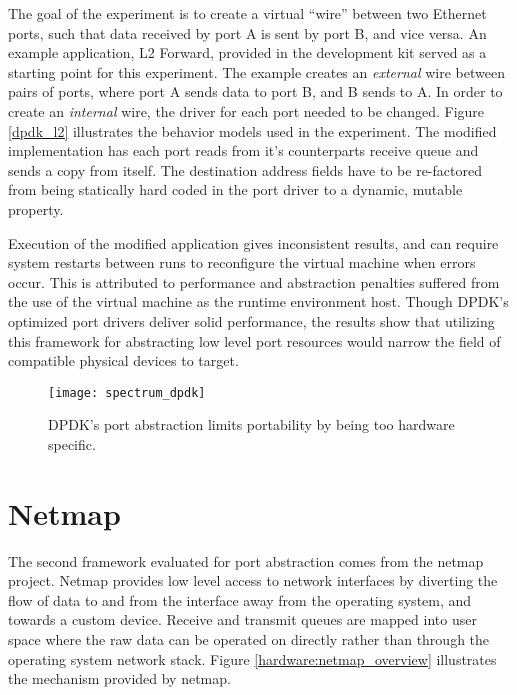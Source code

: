 The goal of the experiment is to create a virtual ``wire'' between two Ethernet
ports, such that data received by port A is sent by port B, and vice versa. An
example application, L2 Forward, provided in the development kit served as a
starting point for this experiment. The example creates an \emph{external}
wire between pairs of ports, where port A sends data to port B, and B sends to
A. In order to create an \emph{internal} wire, the driver for each port needed
to be changed. Figure \ref{dpdk_l2} illustrates the behavior models used in the
experiment. The modified implementation has each port reads from it's
counterparts receive queue and sends a copy from itself.  The destination
address fields have to be re-factored from being statically hard coded in the
port driver to a dynamic, mutable property.

Execution of the modified application gives inconsistent results, and can
require system restarts between runs to reconfigure the virtual machine when
errors occur. This is attributed to performance and abstraction penalties
suffered from the use of the virtual machine as the runtime environment host.
Though DPDK's optimized port drivers deliver solid performance,
the results show that utilizing this framework for abstracting low level port
resources would narrow the field of compatible physical devices to target.

\begin{figure}[h!]
  \centering
  \texttt{[image: spectrum\_dpdk]}
  \caption{DPDK's port abstraction limits portability by being too hardware
  specific.}
  \label{hardware:spectrum_dpdk}
\end{figure}

\section{Netmap}
\label{hardware:netmap}
The second framework evaluated for port abstraction comes from the netmap
project. Netmap provides low level access to network interfaces by diverting
the flow of data to and from the interface away from the operating system, and
towards a custom device. Receive and transmit queues are mapped into user space
where the raw data can be operated on directly rather than through the operating
system network stack. Figure \ref{hardware:netmap_overview} illustrates the
mechanism provided by netmap.

